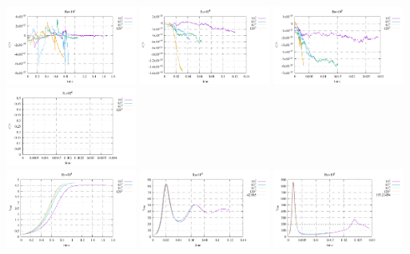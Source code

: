 \begin{center}
\includegraphics[width=4.297cm]{python_codes/fieldstone_155/results/avrg_T_Ra1e3}
\includegraphics[width=4.297cm]{python_codes/fieldstone_155/results/avrg_T_Ra1e4}
\includegraphics[width=4.297cm]{python_codes/fieldstone_155/results/avrg_T_Ra1e5}
\includegraphics[width=4.297cm]{python_codes/fieldstone_155/results/avrg_T_Ra1e6}
\\
\includegraphics[width=4.297cm]{python_codes/fieldstone_155/results/vrms_Ra1e3}
\includegraphics[width=4.297cm]{python_codes/fieldstone_155/results/vrms_Ra1e4}
\includegraphics[width=4.297cm]{python_codes/fieldstone_155/results/vrms_Ra1e5}

\end{center}
